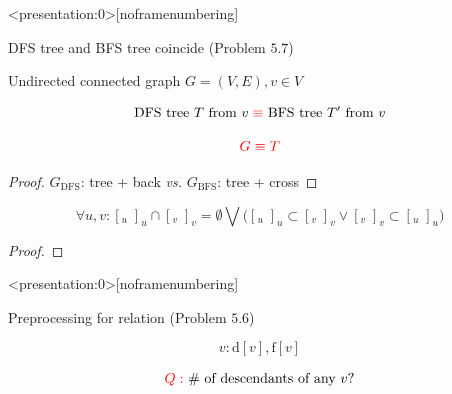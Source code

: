 \begin{frame}<presentation:0>[noframenumbering]
  \begin{exampleblock}{DFS tree and BFS tree coincide (Problem $5.7$)}
    \centerline{Undirected connected graph $G = (V,E), v \in V$}
      
    \[
      \text{DFS tree } T \text{ from } v \;\textcolor{red}{\equiv} \text{ BFS tree } T' \text{ from } v
    \]

    \pause
    \[
      \textcolor{red}{G \equiv T}
    \]
  \end{exampleblock}

  \pause
  \vspace{0.30cm}
  \begin{proof}
    \centerline{$G_{\text{DFS}}$: tree + back \emph{vs.} $G_{\text{BFS}}$: tree + cross}
  \end{proof}

  \pause
  \vspace{0.30cm}
  \begin{center}
  \end{center}
\end{frame}
\begin{frame}{}
  \centerline{}
\end{frame}
\begin{frame}{}
  \begin{theorem}
    \[
      \forall u,v: [_{u} \; ]_{u} \cap [_{v} \; ]_{v} = \emptyset \bigvee 
      \Big([_{u} \; ]_{u} \subset [_{v} \; ]_{v} \lor [_{v} \; ]_{v} \subset [_{u} \; ]_{u}\Big)
    \]
  \end{theorem}

  \pause

  \begin{proof}
  \end{proof}
\end{frame}
\begin{frame}<presentation:0>[noframenumbering]
  \begin{exampleblock}{Preprocessing for  relation (Problem $5.6$)}

    \centerline{}
  \end{exampleblock}

  \pause
  \[
    v: \text{d}[v], \text{f}[v]
  \]

  \pause
  \vspace{-0.20cm}
  \[
    \textcolor{red}{Q: } \text{ \# of descendants of any } v?
  \]
\end{frame}

